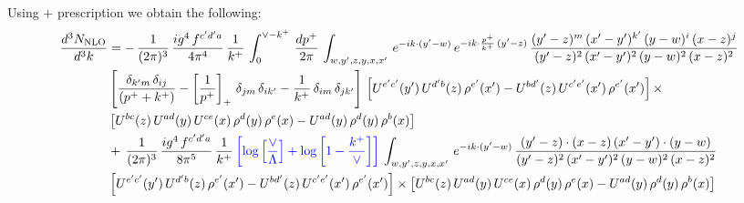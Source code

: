 \documentclass[9pt]{article}
\numberwithin{equation}{section}
\begin{document}
Using $+$ prescription we obtain the following:
\begin{align}
    \frac{d^{3}N_{\rm NLO}}{d^{3}k} & = -\,\frac{1}{(2\pi)^{3}}\, \frac{ig^{4}\,f^{c'd'a}}{4\pi^{4}}\, \frac{1}{k^{+}}\,\int_{0}^{\vee-k^{+}}\, \frac{dp^{+}}{2\pi}\, \int_{w,y',z,y,x,x'}\, e^{-ik\cdot (y'-w)}\, e^{-ik\cdot \frac{p^{+}}{k^{+}}\,(y'-z)}\,\frac{(y'-z)^{m}\,(x'-y')^{k'}\,(y-w)^{i}\,(x-z)^{j}}{(y'-z)^{2}\,(x'-y')^{2}\,(y-w)^{2}\,(x-z)^{2}}\notag \\ & \left[\frac{\delta_{k'm}\,\delta_{ij}}{(p^{+}+k^{+})}-\left[\frac{1}{p^{+}}\right]_{+}\,\delta_{jm}\,\delta_{ik'}-\frac{1}{k^{+}}\, \delta_{im}\, \delta_{jk'}\right]\, \left[U^{e'c'}(y')\,U^{d'b}(z)\,\rho^{e'}(x')-U^{bd'}(z)\,U^{c'e'}(x')\,\rho^{e'}(x')\right]\times\notag \\ &  \left[U^{bc}(z)\,U^{ad}(y)\,U^{ce}(x)\,\rho^{d}(y)\,\rho^{e}(x)-U^{ad}(y)\,\rho^{d}(y)\,\rho^{b}(x)\right]\notag \\ &  +\,\frac{1}{(2\pi)^{3}}\, \frac{ig^{4}\,f^{c'd'a}}{8\pi^{5}}\, \frac{1}{k^{+}}\,{\color{blue}\left[\log{\left[\frac{\vee}{\Lambda}\right]} + \log{\left[1-\frac{k^{+}}{\vee}\right]}\right]}\, \int_{w,y',z,y,x,x'}\, e^{-ik\cdot (y'-w)}\,\frac{(y'-z)\cdot (x-z)\,(x'-y')\cdot (y-w)}{(y'-z)^{2}\,(x'-y')^{2}\,(y-w)^{2}\,(x-z)^{2}}\notag \\ & \left[U^{e'c'}(y')\,U^{d'b}(z)\,\rho^{e'}(x')-U^{bd'}(z)\,U^{c'e'}(x')\,\rho^{e'}(x')\right]\times  \left[U^{bc}(z)\,U^{ad}(y)\,U^{ce}(x)\,\rho^{d}(y)\,\rho^{e}(x)-U^{ad}(y)\,\rho^{d}(y)\,\rho^{b}(x)\right]
\end{align}
\end{document}
